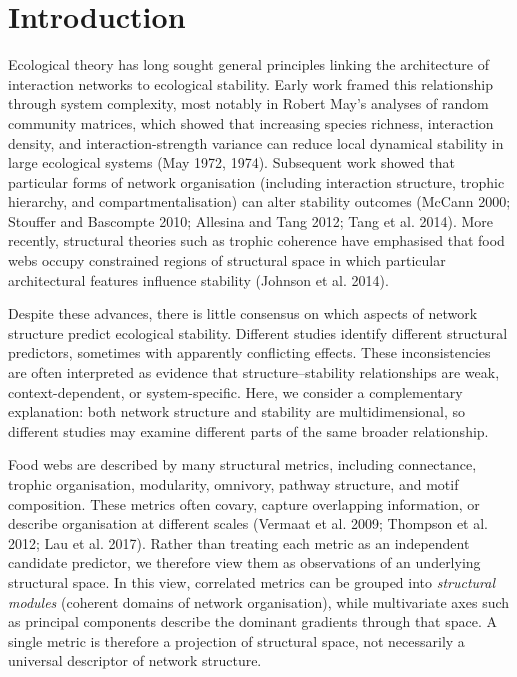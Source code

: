 \documentclass[
]{article}
\begin{document}
\section{Introduction}\label{introduction}

Ecological theory has long sought general principles linking the
architecture of interaction networks to ecological stability. Early work
framed this relationship through system complexity, most notably in
Robert May's analyses of random community matrices, which showed that
increasing species richness, interaction density, and
interaction-strength variance can reduce local dynamical stability in
large ecological systems (May 1972, 1974). Subsequent work showed that
particular forms of network organisation (including interaction
structure, trophic hierarchy, and compartmentalisation) can alter
stability outcomes (McCann 2000; Stouffer and Bascompte 2010; Allesina
and Tang 2012; Tang et al. 2014). More recently, structural theories
such as trophic coherence have emphasised that food webs occupy
constrained regions of structural space in which particular
architectural features influence stability (Johnson et al. 2014).

Despite these advances, there is little consensus on which aspects of
network structure predict ecological stability. Different studies
identify different structural predictors, sometimes with apparently
conflicting effects. These inconsistencies are often interpreted as
evidence that structure--stability relationships are weak,
context-dependent, or system-specific. Here, we consider a complementary
explanation: both network structure and stability are multidimensional,
so different studies may examine different parts of the same broader
relationship.

Food webs are described by many structural metrics, including
connectance, trophic organisation, modularity, omnivory, pathway
structure, and motif composition. These metrics often covary, capture
overlapping information, or describe organisation at different scales
(Vermaat et al. 2009; Thompson et al. 2012; Lau et al. 2017). Rather
than treating each metric as an independent candidate predictor, we
therefore view them as observations of an underlying structural space.
In this view, correlated metrics can be grouped into \emph{structural
modules} (coherent domains of network organisation), while multivariate
axes such as principal components describe the dominant gradients
through that space. A single metric is therefore a projection of
structural space, not necessarily a universal descriptor of network
structure.
\end{document}
